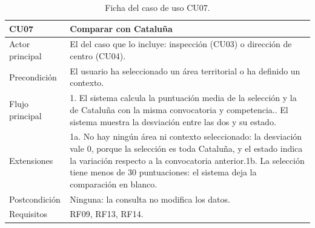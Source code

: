 \documentclass[12pt, a4paper, oneside]{report}
\begin{document}
\begin{table}[!tbp]
\centering
\small
{}\renewcommand{\arraystretch}{1.1}
\begin{tabularx}{\textwidth}{@{} >{\raggedright\arraybackslash}p{2.8cm} X @{}}
\toprule
\textbf{CU07} & \textbf{Comparar con Cataluña} \\ \midrule
Actor principal & El del caso que lo incluye: inspección (CU03) o dirección de centro (CU04). \\ \addlinespace
Precondición & El usuario ha seleccionado un área territorial o ha definido un contexto. \\ \addlinespace
Flujo principal & 1. El sistema calcula la puntuación media de la selección y la de Cataluña con la misma convocatoria y competencia.\newline 2. El sistema muestra la desviación entre las dos y su estado. \\ \addlinespace
Extensiones & 1a. No hay ningún área ni contexto seleccionado: la desviación vale 0, porque la selección es toda Cataluña, y el estado indica la variación respecto a la convocatoria anterior.\newline 1b. La selección tiene menos de 30 puntuaciones: el sistema deja la comparación en blanco. \\ \addlinespace
Postcondición & Ninguna: la consulta no modifica los datos. \\ \addlinespace
Requisitos & RF09, RF13, RF14. \\ \bottomrule
\end{tabularx}
\caption{Ficha del caso de uso CU07.}
\label{tab:cu07}
\end{table}
\end{document}

